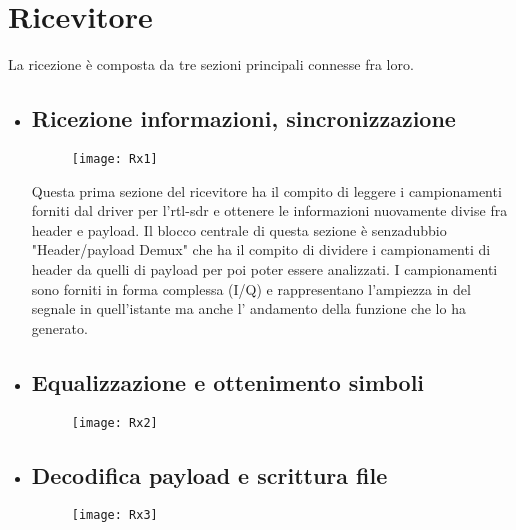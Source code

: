  \section{Ricevitore}
 La ricezione è composta da tre sezioni principali connesse fra loro.
 \begin{itemize}
 	\item \subsection{Ricezione informazioni, sincronizzazione}
 	\begin{figure}[h]
 		\centering
 		\texttt{[image: Rx1]}
 		\caption{}
 	\end{figure}
 Questa prima sezione del ricevitore ha il compito di leggere i campionamenti forniti dal driver per l'rtl-sdr e ottenere le informazioni nuovamente divise fra header e payload. Il blocco centrale di questa sezione è senzadubbio "Header/payload Demux" che ha il compito di dividere i campionamenti di header da quelli di payload per poi poter essere analizzati. I campionamenti sono forniti in forma complessa (I/Q) e rappresentano l'ampiezza in del segnale in quell'istante ma anche l' andamento della funzione che lo ha generato. 
 	\item \subsection{Equalizzazione e ottenimento simboli}
 	\begin{figure}[h]
 		\centering
 		\texttt{[image: Rx2]}
 		\caption{}
 	\end{figure}
 	\item \subsection{Decodifica payload e scrittura file}
 	\begin{figure}[h]
 		\centering
 		\texttt{[image: Rx3]}
 		\caption{}
 	\end{figure}
 \end{itemize}



